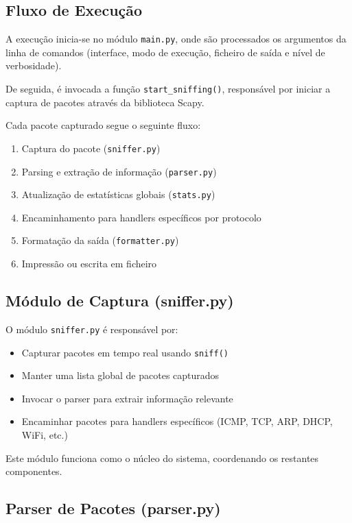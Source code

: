 \documentclass[a4paper,12pt]{article}
\begin{document}
\subsection{Fluxo de Execução}

A execução inicia-se no módulo \texttt{main.py}, onde são processados os argumentos da linha de comandos (interface, modo de execução, ficheiro de saída e nível de verbosidade).

De seguida, é invocada a função \texttt{start\_sniffing()}, responsável por iniciar a captura de pacotes através da biblioteca Scapy.

Cada pacote capturado segue o seguinte fluxo:

\begin{enumerate}
    \item Captura do pacote (\texttt{sniffer.py})
    \item Parsing e extração de informação (\texttt{parser.py})
    \item Atualização de estatísticas globais (\texttt{stats.py})
    \item Encaminhamento para handlers específicos por protocolo
    \item Formatação da saída (\texttt{formatter.py})
    \item Impressão ou escrita em ficheiro
\end{enumerate}

\subsection{Módulo de Captura (sniffer.py)}

O módulo \texttt{sniffer.py} é responsável por:

\begin{itemize}
    \item Capturar pacotes em tempo real usando \texttt{sniff()}
    \item Manter uma lista global de pacotes capturados
    \item Invocar o parser para extrair informação relevante
    \item Encaminhar pacotes para handlers específicos (ICMP, TCP, ARP, DHCP, WiFi, etc.)
\end{itemize}

Este módulo funciona como o núcleo do sistema, coordenando os restantes componentes.

\subsection{Parser de Pacotes (parser.py)}
\end{document}
